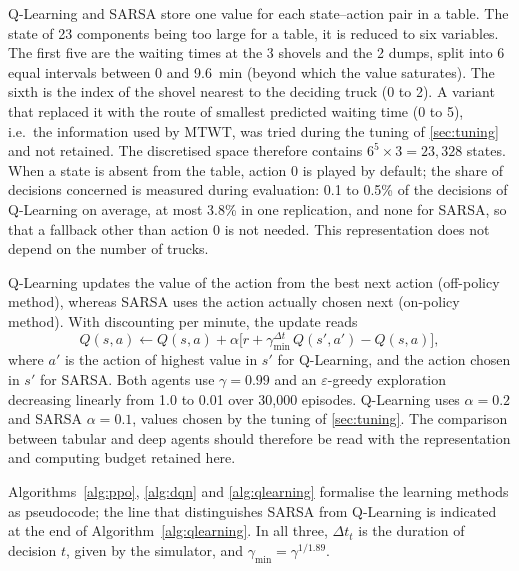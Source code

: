 \documentclass[11pt,a4paper]{article}
\newif\ifrevmarks
\newcommand{\revtag}[1]{\ifrevmarks\textsuperscript{\textcolor{red!70!black}{\scriptsize[#1]}}\fi}
\newcommand{\rev}[2]{\ifrevmarks{\color{revcolor}#2}\revtag{#1}\else#2\fi}
\newenvironment{revbloc}[1]{\par\ifrevmarks\color{revcolor}\noindent\revtag{#1}\ \fi}{\par}
\newif\ifcorrmarks
\newcommand{\corr}[1]{\ifcorrmarks\textcolor{corrcolor}{#1}\else#1\fi}
\begin{document}
\begin{revbloc}{M8, v3}
Q-Learning \cite{WatkinsDayan1992} and SARSA \cite{RummeryNiranjan1994} store one value for each state--action pair in a table. The state of 23 components being too large for a table, it is reduced to six variables. The first five are the waiting times at the 3 shovels and the 2 dumps, split into 6 equal intervals between 0 and 9.6~min (beyond which the value saturates). The sixth is the index of the shovel nearest to the deciding truck (0 to 2). A variant that replaced it with the route of smallest predicted waiting time (0 to 5), i.e.\ the information used by MTWT, was tried during the tuning of \cref{sec:tuning} and not retained. The discretised space therefore contains $6^5 \times 3 = 23{,}328$ states. When a state is absent from the table, action 0 is played by default; the share of decisions concerned is measured during evaluation\corr{: 0.1 to 0.5\% of the decisions of Q-Learning on average, at most 3.8\% in one replication, and none for SARSA, so that a fallback other than action 0 is not needed}. This representation does not depend on the number of trucks.

Q-Learning updates the value of the action from the best next action (off-policy method), whereas SARSA uses the action actually chosen next (on-policy method). With discounting per minute, the update reads
\begin{equation}
Q(s,a) \leftarrow Q(s,a) + \alpha \big[ r + \gamma_{\min}^{\Delta t}\, Q(s',a') - Q(s,a) \big] ,
\end{equation}
where $a'$ is the action of highest value in $s'$ for Q-Learning, and the action chosen in $s'$ for SARSA. Both agents use $\gamma = 0.99$ and an $\varepsilon$-greedy exploration decreasing linearly from 1.0 to 0.01 over 30{,}000 episodes. Q-Learning uses $\alpha = 0.2$ and SARSA $\alpha = 0.1$, values chosen by the tuning of \cref{sec:tuning}. The comparison between tabular and deep agents should therefore be read with the representation and computing budget retained here.
\end{revbloc}

Algorithms~\ref{alg:ppo}, \ref{alg:dqn} and \ref{alg:qlearning} formalise the learning methods as pseudocode; the line that distinguishes SARSA from Q-Learning is indicated at the end of Algorithm~\ref{alg:qlearning}. \rev{v3}{In all three, $\Delta t_t$ is the duration of decision $t$, given by the simulator, and $\gamma_{\min} = \gamma^{1/1.89}$.}
\end{document}
